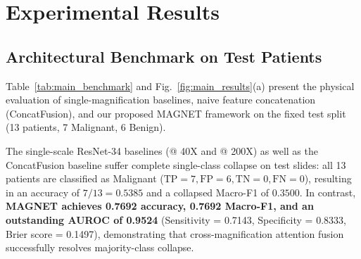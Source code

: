 \documentclass[conference]{IEEEtran}
\begin{document}
\section{Experimental Results}
\label{sec:results}

\subsection{Architectural Benchmark on Test Patients}
Table~\ref{tab:main_benchmark} and Fig.~\ref{fig:main_results}(a) present the physical evaluation of single-magnification baselines, naive feature concatenation (ConcatFusion), and our proposed MAGNET framework on the fixed test split (13 patients, 7 Malignant, 6 Benign).

\begin{table}[!t]
\centering
\caption{Architectural Benchmark on Physical Test Set (N=13 Patients)}
\label{tab:main_benchmark}
\end{table}

The single-scale ResNet-34 baselines (@ 40X and @ 200X) as well as the ConcatFusion baseline suffer complete single-class collapse on test slides: all 13 patients are classified as Malignant ($\text{TP}=7, \text{FP}=6, \text{TN}=0, \text{FN}=0$), resulting in an accuracy of $7/13 = 0.5385$ and a collapsed Macro-F1 of $0.3500$. In contrast, \textbf{MAGNET achieves 0.7692 accuracy, 0.7692 Macro-F1, and an outstanding AUROC of 0.9524} (Sensitivity = 0.7143, Specificity = 0.8333, Brier score = 0.1497), demonstrating that cross-magnification attention fusion successfully resolves majority-class collapse.
\end{document}
